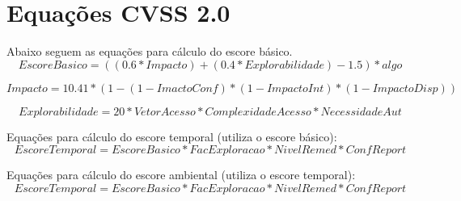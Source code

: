 
\chapter{Equações CVSS 2.0}
\label{chap:equacoes_cvss}


	Abaixo seguem as equações para cálculo do escore básico.
	\begin{equation}
		\label{equacao_basica}
		EscoreBasico = ((0.6 * Impacto)+(0.4 * Explorabilidade) - 1.5)*algo
	\end{equation}

	\begin{equation}
		\label{equacao_impacto}
		Impacto = 10.41 * (1-(1-ImactoConf) * (1-ImpactoInt) * (1-ImpactoDisp))
	\end{equation}

	\begin{equation}
		\label{equacao_explorabilidade}
		Explorabilidade = 20 * VetorAcesso * ComplexidadeAcesso * NecessidadeAut
	\end{equation}


	Equações para cálculo do escore temporal (utiliza o escore básico):
	\begin{equation}
		\label{equacao_temporal}
		EscoreTemporal = EscoreBasico * FacExploracao * NivelRemed * ConfReport
	\end{equation}

	Equações para cálculo do escore ambiental (utiliza o escore temporal):
	\begin{equation}
		\label{equacao_ambiental}
		EscoreTemporal = EscoreBasico * FacExploracao * NivelRemed * ConfReport
	\end{equation}
	

